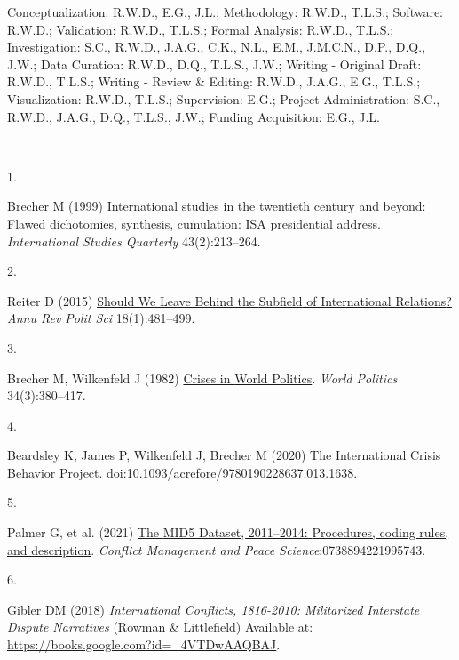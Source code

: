 \documentclass{article}
\newlength{\cslhangindent}
\newlength{\csllabelwidth}
\newlength{\cslentryspacingunit} %
\newenvironment{CSLReferences}[2] %
 {%
  \setlength{\parindent}{0pt}
  \ifodd #1
  \let\oldpar\par
  \def\par{\hangindent=\cslhangindent\oldpar}
  \fi
  \setlength{\parskip}{#2\cslentryspacingunit}
 }%
 {}
\newcommand{\CSLLeftMargin}[1]{\parbox[t]{\csllabelwidth}{#1}}
\newcommand{\CSLRightInline}[1]{\parbox[t]{\linewidth - \csllabelwidth}{#1}\break}
\begin{document}
Conceptualization: R.W.D., E.G., J.L.; Methodology: R.W.D., T.L.S.;
Software: R.W.D.; Validation: R.W.D., T.L.S.; Formal Analysis: R.W.D.,
T.L.S.; Investigation: S.C., R.W.D., J.A.G., C.K., N.L., E.M., J.M.C.N.,
D.P., D.Q., J.W.; Data Curation: R.W.D., D.Q., T.L.S., J.W.; Writing -
Original Draft: R.W.D., T.L.S.; Writing - Review \& Editing: R.W.D.,
J.A.G., E.G., T.L.S.; Visualization: R.W.D., T.L.S.; Supervision: E.G.;
Project Administration: S.C., R.W.D., J.A.G., D.Q., T.L.S., J.W.;
Funding Acquisition: E.G., J.L.

~

\hypertarget{refs}{}
\begin{CSLReferences}{0}{0}
\leavevmode{}%
\CSLLeftMargin{1. }%
\CSLRightInline{Brecher M (1999) International studies in the twentieth
century and beyond: {Flawed} dichotomies, synthesis, cumulation: {ISA}
presidential address. \emph{International Studies Quarterly}
43(2):213--264.}

\leavevmode{}%
\CSLLeftMargin{2. }%
\CSLRightInline{Reiter D (2015)
\href{https://doi.org/10.1146/annurev-polisci-053013-041156}{Should {We
Leave Behind} the {Subfield} of {International Relations}?} \emph{Annu
Rev Polit Sci} 18(1):481--499.}

\leavevmode{}%
\CSLLeftMargin{3. }%
\CSLRightInline{Brecher M, Wilkenfeld J (1982)
\href{https://doi.org/10.2307/2010324}{Crises in {World Politics}}.
\emph{World Politics} 34(3):380--417.}

\leavevmode{}%
\CSLLeftMargin{4. }%
\CSLRightInline{Beardsley K, James P, Wilkenfeld J, Brecher M (2020) The
{International Crisis Behavior Project}.
doi:\href{https://doi.org/10.1093/acrefore/9780190228637.013.1638}{10.1093/acrefore/9780190228637.013.1638}.}

\leavevmode{}%
\CSLLeftMargin{5. }%
\CSLRightInline{Palmer G, et al. (2021)
\href{https://doi.org/10.1177/0738894221995743}{The {MID5 Dataset},
2011--2014: {Procedures}, coding rules, and description}. \emph{Conflict
Management and Peace Science}:0738894221995743.}

\leavevmode{}%
\CSLLeftMargin{6. }%
\CSLRightInline{Gibler DM (2018) \emph{International {Conflicts},
1816-2010: {Militarized Interstate Dispute Narratives}} ({Rowman \&
Littlefield}) Available at:
\url{https://books.google.com?id=_4VTDwAAQBAJ}.}


\end{CSLReferences}
\end{document}
